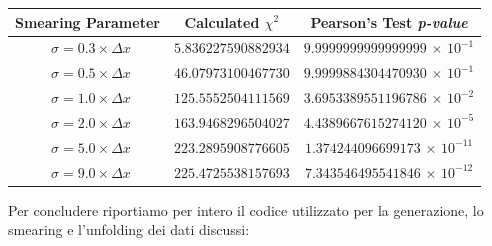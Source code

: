  \bgroup
\def\arraystretch{2}
\begin{center}
	\begin{tabular}{c||c|c}
		{Smearing Parameter} & Calculated $\chi^2$ & Pearson's Test \emph{p-value}\\  \hline
		$\enspace\sigma = 0.3\times\Delta x$ & $5.836227590882934$ & $9.9999999999999999\,\times\,10^{-1} $\\
		$\enspace\sigma = 0.5\times\Delta x$ & $46.07973100467730$ & $9.9999884304470930\,\times\,10^{-1} $\\
		$\enspace\sigma = 1.0\times\Delta x$ & $125.5552504111569$ & $3.6953389551196786\,\times\,10^{-2} $\\
		$\enspace\sigma = 2.0\times\Delta x$ & $163.9468296504027$ & $4.4389667615274120\,\times\,10^{-5} $\\
		$\enspace\sigma = 5.0\times\Delta x$ & $223.2895908776605$ & $1.374244096699173\,\times\,10^{-11} $\\
		$\enspace\sigma = 9.0\times\Delta x$ & $225.4725538157693$ & $7.343546495541846\,\times\,10^{-12}$\\

	\end{tabular}
\end{center}
\egroup

\medskip

\noindent Per concludere riportiamo per intero il codice utilizzato per la generazione, lo smearing e l'unfolding dei dati discussi:

